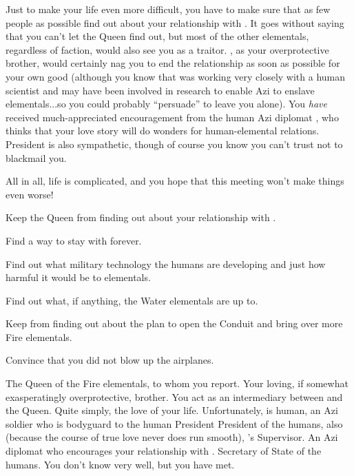 \documentclass[char]{elementals}
\begin{document}
Just to make your life even more difficult, you have to make sure that as few people as possible find out about your relationship with \cRomeo{}.  It goes without saying that you can't let the Queen find out, but most of the other elementals, regardless of faction, would also see you as a traitor.  \cPyro{}, as your overprotective brother, would certainly nag you to end the relationship as soon as possible for your own good (although you know that \cPyro{\they} was working very closely with a human scientist \cMS{\intro} and may have been involved in research to enable Azi to enslave elementals...so you could probably ``persuade'' \cPyro{\them} to leave you alone).  You \emph{have} received much-appreciated encouragement from the human Azi diplomat \cDiplomat{\intro}, who thinks that your love story will do wonders for human-elemental relations.  President \cLeader{} is also sympathetic, though of course you know you can't trust \cLeader{\them} not to blackmail you.

All in all, life is complicated, and you hope that this meeting won't make things even worse!

\begin{itemz}[Goals]
  \item Keep the Queen from finding out about your relationship with \cRomeo{}.
  \item Find a way to stay with \cRomeo{} forever.
  \item Find out what military technology the humans are developing and just how harmful it would be to elementals.
  \item Find out what, if anything, the Water elementals are up to.
  \item Keep \cRomeo{} from finding out about the plan to open the Conduit and bring over more Fire elementals.
  \item Convince \cRomeo{} that you did not blow up the airplanes.
\end{itemz}

\begin{contacts}
  \contact{\cQueen{}} The Queen of the Fire elementals, to whom you report.
  \contact{\cPyro{}} Your loving, if somewhat exasperatingly overprotective, brother.
  \contact{\cKing{}} You act as an intermediary between \cKing{\them} and the Queen.
  \contact{\cRomeo{}} Quite simply, the love of your life.  Unfortunately, \cRomeo{\they} is human, an Azi soldier who is bodyguard to the human President
  \contact{\cLeader{}} President of the humans, also (because the course of true love never does run smooth), \cRomeo{}'s Supervisor.
  \contact{\cDiplomat{}} An Azi diplomat who encourages your relationship with \cRomeo{}.
  \contact{\cDema{}} Secretary of State of the humans.  You don't know \cDema{\them} very well, but you have met.
\end{contacts}
\end{document}
